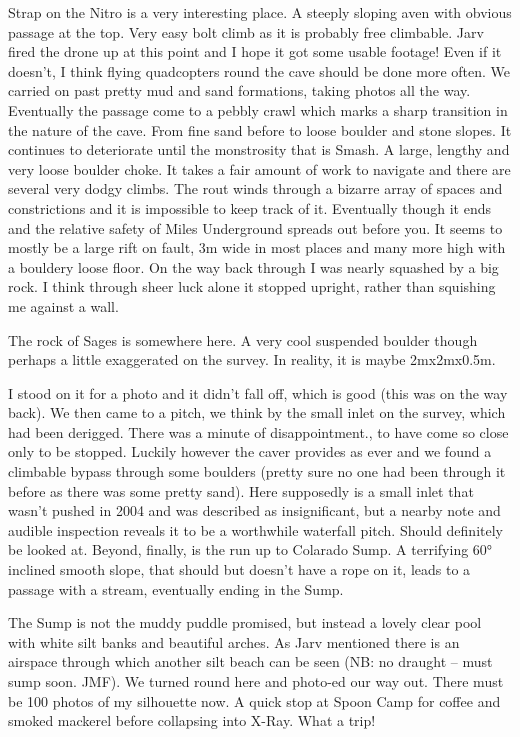 Strap on the Nitro is a very interesting place. A steeply sloping aven with obvious passage at the top. Very easy bolt climb as it is probably free climbable. Jarv fired the drone up at this point and I hope it got some usable footage! Even if it doesn't,  I think flying quadcopters round the cave should be done more often.
We carried on past pretty mud  and sand formations, taking photos all the way. Eventually the passage come to a pebbly crawl which marks a sharp transition in the nature of the cave.  From fine sand before to loose boulder and stone slopes. It continues to deteriorate until the monstrosity that is Smash. A large, lengthy and very loose boulder choke. 
It takes a fair amount of work to navigate and there are several very dodgy climbs. The rout winds through a bizarre array of spaces and constrictions and it is impossible to keep track of it.
Eventually though it ends and the relative safety of Miles Underground spreads out before you. It seems to mostly be a large rift on fault, 3m wide in most places and many more high with a bouldery loose floor. On the way back through I was nearly squashed by a big rock. I think through sheer luck alone it stopped upright, rather than squishing me against a wall. 

The rock of Sages is somewhere here. A very cool suspended boulder though perhaps a little exaggerated on the survey. In reality, it is maybe 2mx2mx0.5m.

I stood on it for a photo and it didn't fall off, which is good (this was on the way back).
We then came to  a pitch, we think by the small inlet on the survey, which had been derigged. There was a minute of disappointment., to have come so close only to be stopped. Luckily however the caver provides as ever and we found a climbable bypass through some boulders (pretty sure no one had been through it before as there was some pretty sand).
Here supposedly is a small inlet that wasn't pushed in 2004 and was described as insignificant, but a nearby note and audible inspection reveals it to be a worthwhile waterfall pitch. Should definitely be looked at.
Beyond, finally, is the run up to Colarado Sump. A terrifying 60° inclined smooth slope, that should but doesn't have a rope on it,  leads to a passage with a stream, eventually ending in the Sump. 

The Sump is not the muddy puddle promised, but instead a lovely clear pool with white silt banks and beautiful arches. As Jarv mentioned there is an airspace through which another silt beach can be seen (NB: no draught – must sump soon. JMF). 
We turned round here and photo-ed our way out. There must be 100 photos of my silhouette now. A quick stop at Spoon Camp for coffee and smoked mackerel before collapsing into X-Ray. 
What a trip!

\begin{figure*}[t!]
\checkoddpage \ifoddpage \forcerectofloat \else \forceversofloat \fi

\end{figure*}
